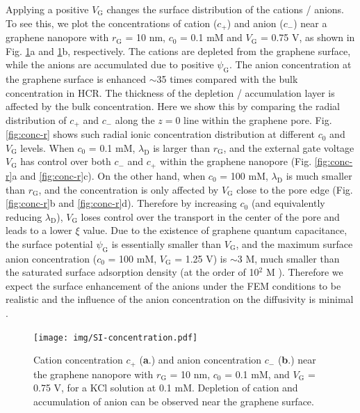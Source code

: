 \documentclass[manuscript=suppinfo,email=true, hyperref=true, keywords=false]{achemso}
\newcommand{\Fig}{Fig.}
\begin{document}
Applying a positive $V_{\mathrm{G}}$ changes the surface distribution
of the cations / anions. To see this, we plot the concentrations of
cation ($c_{+}$) and anion ($c_{-}$) near a graphene nanopore with
$r_{\mathrm{G}}$ = 10 nm, $c_{0}$ = 0.1 mM and $V_{\mathrm{G}}$ =
0.75 V, as shown in \Fig{} \ref{fig:conc}a and \ref{fig:conc}b,
respectively. The cations are depleted from the graphene surface,
while the anions are accumulated due to positive
$\psi_{\mathrm{G}}$. The anion concentration at the graphene surface
is enhanced $\sim{}$35 times compared with the bulk concentration in
HCR. The thickness of the depletion / accumulation layer is affected
by the bulk concentration. Here we show this by comparing the radial
distribution of $c_{+}$ and $c_{-}$ along the $z = 0$ line within the
graphene pore. \Fig{} \ref{fig:conc-r} shows such radial ionic
concentration distribution at different $c_{0}$ and $V_{\mathrm{G}}$
levels. When $c_{0}$ = 0.1 mM, $\lambda_{\mathrm{D}}$ is larger than
$r_{\mathrm{G}}$, and the external gate voltage $V_{\mathrm{G}}$ has
control over both $c_{-}$ and $c_{+}$ within the graphene nanopore
(\Fig{} \ref{fig:conc-r}a and \ref{fig:conc-r}c). On the other
hand, when $c_{0}$ = 100 mM, $\lambda_{\mathrm{D}}$ is much smaller
than $r_{\mathrm{G}}$, and the concentration is only affected by
$V_{\mathrm{G}}$ close to the pore edge (\Fig{} \ref{fig:conc-r}b
and \ref{fig:conc-r}d). Therefore by increasing $c_{0}$ (and
equivalently reducing $\lambda_{\mathrm{D}}$), $V_{\mathrm{G}}$ loses
control over the transport in the center of the pore and leads to a
lower $\xi$ value. Due to the existence of graphene quantum
capacitance, the surface potential $\psi_{\mathrm{G}}$ is essentially
smaller than $V_{\mathrm{G}}$, and the maximum surface anion
concentration ($c_{0}$ = 100 mM, $V_{\mathrm{G}}$ = 1.25 V) is
$\sim{}$3 M, much smaller than the saturated surface adsorption
density (at the order of 10$^{2}$ M
\cite{bard_electrochemical_1980}). Therefore we expect the surface
enhancement of the anions under the FEM conditions to be realistic and
the influence of the anion concentration on the diffusivity is minimal
\cite{Tang_1999_I}.


\begin{figure}[htbp]
  \centering
  \texttt{[image: img/SI-concentration.pdf]}
  \caption{Cation concentration $c_{+}$ (\textbf{a}.) and anion
    concentration $c_{-}$ (\textbf{b}.) near the graphene nanopore
    with $r_{\mathrm{G}}$ = 10 nm, $c_{0}$ = 0.1 mM, and
    $V_{\mathrm{G}}$ = 0.75 V, for a KCl solution at 0.1
    mM. Depletion of cation and accumulation of anion can be observed
    near the graphene surface.}
  \label{fig:conc}
\end{figure}
\end{document}
